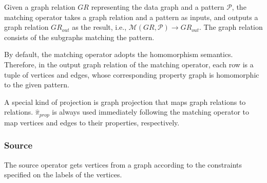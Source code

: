 \begin{definition}
    Given a graph relation $GR$ representing the data graph and a pattern $\mathcal{P}$, the matching operator takes a graph relation and a pattern as inputs, and outputs a graph relation $GR_{out}$ as the result, i.e., $\mathcal{M}(GR, \mathcal{P}) \rightarrow GR_{out}$.
    The graph relation consists of the subgraphs matching the pattern.
\end{definition}

By default, the matching operator adopts the homomorphism semantics.
Therefore, in the output graph relation of the matching operator, each row is a tuple of vertices and edges, whose corresponding property graph is homomorphic to the given pattern.

A special kind of projection is graph projection that maps graph relations to relations.
$\widehat{\pi}_{prop}$ is always used immediately following the matching operator to map vertices and edges to their properties, respectively.

\iffalse
\subsubsection{Source}
The source operator gets vertices from a graph according to the constraints specified on the labels of the vertices.

